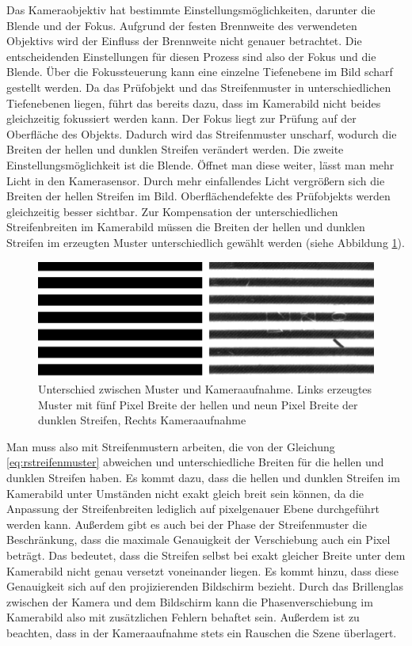 Das Kameraobjektiv hat bestimmte Einstellungsmöglichkeiten, darunter die Blende und der Fokus.
Aufgrund der festen Brennweite des verwendeten Objektivs wird der Einfluss der Brennweite nicht genauer betrachtet.
Die entscheidenden Einstellungen für diesen Prozess sind also der Fokus und die Blende.
Über die Fokussteuerung kann eine einzelne Tiefenebene im Bild scharf gestellt werden.
Da das Prüfobjekt und das Streifenmuster in unterschiedlichen Tiefenebenen liegen, führt das bereits dazu, dass im Kamerabild nicht beides gleichzeitig fokussiert werden kann.
Der Fokus liegt zur Prüfung auf der Oberfläche des Objekts.
Dadurch wird das Streifenmuster unscharf, wodurch die Breiten der hellen und dunklen Streifen verändert werden.
Die zweite Einstellungsmöglichkeit ist die Blende.
Öffnet man diese weiter, lässt man mehr Licht in den Kamerasensor.
Durch mehr einfallendes Licht vergrößern sich die Breiten der hellen Streifen im Bild.
Oberflächendefekte des Prüfobjekts werden gleichzeitig besser sichtbar.
Zur Kompensation der unterschiedlichen Streifenbreiten im Kamerabild müssen die Breiten der hellen und dunklen Streifen im erzeugten Muster unterschiedlich gewählt werden (siehe Abbildung \ref{img:differenceCamPat}).

\begin{figure}[H]
	\centering
	\includegraphics[width=\textwidth]{03_sichtpruefungDurchLichtstreuung/optimierungen/unterschiedeKameraUndMonitor/figures/differenceCameraPattern}
	\caption[Unterschied zwischen Muster und Kameraaufnahme]{Unterschied zwischen Muster und Kameraaufnahme. Links erzeugtes Muster mit fünf Pixel Breite der hellen und neun Pixel Breite der dunklen Streifen, Rechts Kameraaufnahme}
	\label{img:differenceCamPat}
\end{figure}

\noindent
Man muss also mit Streifenmustern arbeiten, die von der Gleichung \ref{eq:rstreifenmuster} abweichen und unterschiedliche Breiten für die hellen und dunklen Streifen haben.
Es kommt dazu, dass die hellen und dunklen Streifen im Kamerabild unter Umständen nicht exakt gleich breit sein können, da die Anpassung der Streifenbreiten lediglich auf pixelgenauer Ebene durchgeführt werden kann.
Außerdem gibt es auch bei der Phase der Streifenmuster die Beschränkung, dass die maximale Genauigkeit der Verschiebung auch ein Pixel beträgt.
Das bedeutet, dass die Streifen selbst bei exakt gleicher Breite unter dem Kamerabild nicht genau versetzt voneinander liegen.
Es kommt hinzu, dass diese Genauigkeit sich auf den projizierenden Bildschirm bezieht.
Durch das Brillenglas zwischen der Kamera und dem Bildschirm kann die Phasenverschiebung im Kamerabild also mit zusätzlichen Fehlern behaftet sein.
Außerdem ist zu beachten, dass in der Kameraaufnahme stets ein Rauschen die Szene überlagert.